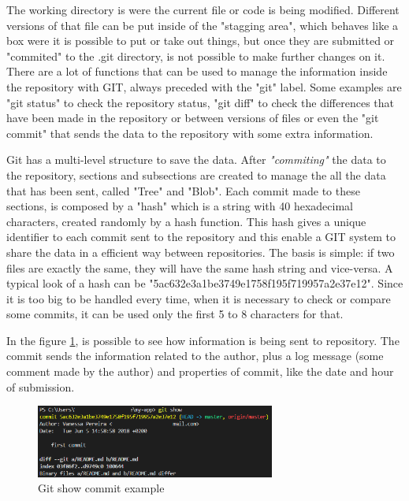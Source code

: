 \documentclass[mim_thesis.tex]{subfiles}
\begin{document}
The working directory is were the current file or code is being modified. Different versions of that file can be put inside of the "stagging area", which behaves like a box were it is possible to put or take out things, but once they are submitted or "commited" to the .git directory, is not possible to make further changes on it. There are a lot of functions that can be used to manage the information inside the repository with GIT, always preceded with the "git" label. Some examples are "git status" to check the repository status, "git diff" to check the differences that have been made in the repository or between versions of files or even the "git commit" that sends the data to the repository with some extra information.

Git has a multi-level structure to save the data. After \textit{"commiting"} the data to the repository, sections and subsections are created to manage the all the data that has been sent, called "Tree" and "Blob". Each commit made to these sections, is composed by a "hash" which is a string with 40 hexadecimal characters, created randomly by a hash function. This hash gives a unique identifier to each commit sent to the repository and this enable a GIT system to share the data in a efficient way between repositories. The basis is simple: if two files are exactly the same, they will have the same hash string and vice-versa. A typical look of a hash can be "5ac632e3a1be3749e1758f195f719957a2e37e12". Since it is too big to be handled every time, when it is necessary to check or compare some commits, it can be used only the first 5 to 8 characters for that.

In the figure \ref{fig:commit_example}, is possible to see how information is being sent to repository. The commit sends the information related to the author, plus a log message (some comment made by the author) and properties of commit, like the date and hour of submission. 

\begin{figure}[H]
	\centering
    \includegraphics[width=0.7\textwidth]{img/commit_example.PNG}
	\caption{Git show commit example}
	\label{fig:commit_example}
\end{figure}
\end{document}
